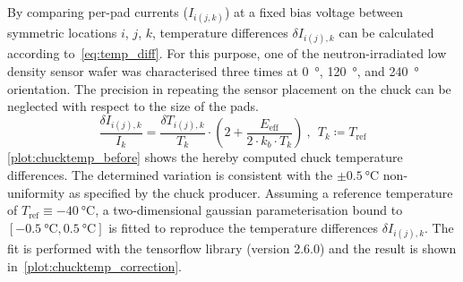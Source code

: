 By comparing per-pad currents ($I_{i(j,k)}$) at a fixed bias voltage between symmetric locations $i$, $j$, $k$, temperature differences $\delta I_{i(j), k}$ can be calculated according to~\ref{eq:temp_diff}.
For this purpose, one of the neutron-irradiated low density sensor wafer was characterised three times at \SI{0}{\degree}, \SI{120}{\degree}, and \SI{240}{\degree} orientation.
The precision in repeating the sensor placement on the chuck can be neglected with respect to the size of the pads. 
\begin{equation}
    \frac{\delta I_{i(j),k}}{I_k} = \frac{\delta T_{i(j), k}}{T_k} \cdot \left(2 + \frac{E_\text{eff}}{2\cdot k_b \cdot T_k} \right)~,~~T_k \coloneqq T_\text{ref}
    \label{eq:temp_diff}
\end{equation}
\ref{plot:chucktemp_before} shows the hereby computed chuck temperature differences.
The determined variation is consistent with the $\pm\SI{0.5}{\celsius}$ non-uniformity as specified by the chuck producer.
Assuming a reference temperature of $T_\text{ref}\equiv\SI{-40}{\celsius}$, a two-dimensional gaussian parameterisation bound to $[\SI{-0.5}{\celsius}, \SI{0.5}{\celsius}]$ is fitted to reproduce the temperature differences $\delta I_{i(j),k}$.
The fit is performed with the tensorflow library (version 2.6.0) and the result is shown in~\ref{plot:chucktemp_correction}.
